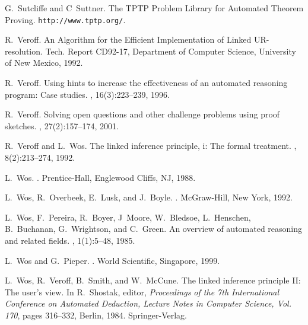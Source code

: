\documentclass[11pt]{article}
\begin{document}
\begin{thebibliography}{10}
G.~Sutcliffe and C~Suttner.
\newblock The {TPTP} {P}roblem {L}ibrary for {A}utomated {T}heorem {P}roving.
\newblock \verb|http://www.tptp.org/|.

R.~Veroff.
\newblock An {A}lgorithm for the {E}fficient {I}mplementation of {L}inked
  {UR}-resolution.
\newblock Tech. Report CD92-17, Department of Computer Science, University of
  New Mexico, 1992.

R.~Veroff.
\newblock Using hints to increase the effectiveness of an automated reasoning
  program: Case studies.
, 16(3):223--239, 1996.

R.~Veroff.
\newblock Solving open questions and other challenge problems using proof
  sketches.
, 27(2):157--174, 2001.

R.~Veroff and L.~Wos.
\newblock The linked inference principle, i: The formal treatment.
, 8(2):213--274, 1992.

L.~Wos.
.
\newblock Prentice-Hall, Englewood Cliffs, NJ, 1988.

L.~Wos, R.~Overbeek, E.~Lusk, and J.~Boyle.
.
\newblock McGraw-Hill, New York, 1992.

L.~Wos, F.~Pereira, R.~Boyer, J~Moore, W.~Bledsoe, L.~Henschen, B.~Buchanan,
  G.~Wrightson, and C.~Green.
\newblock An overview of automated reasoning and related fields.
, 1(1):5--48, 1985.

L.~Wos and G.~Pieper.
.
\newblock World Scientific, Singapore, 1999.

L.~Wos, R.~Veroff, B.~Smith, and W.~McCune.
\newblock The linked inference principle {II}: {T}he user's view.
\newblock In R.~Shostak, editor, {\em Proceedings of the 7th International
  Conference on Automated Deduction, Lecture Notes in Computer Science, Vol.
  170}, pages 316--332, Berlin, 1984. Springer-Verlag.

\end{thebibliography}
\end{document}
